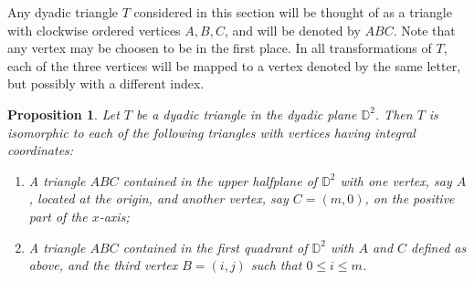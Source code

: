 \documentclass[12pt]{amsart}
\def\mbD{\mathbb{D}}
\theoremstyle{plain}
\newtheorem{proposition}[theorem]{Proposition}
\theoremstyle{definition}
\numberwithin{equation}{section}
\begin{document}
Any dyadic triangle $T$ considered in this section will be thought of as a triangle with
clockwise ordered vertices $A, B, C$, and will be denoted by $ABC$. Note that any vertex may be choosen to be in the first place.
In all transformations of $T$, each of the three vertices will be mapped to a
vertex denoted by the same letter, but possibly with a different index.



\begin{proposition}\label{P:newclassif1}
Let $T$ be a dyadic triangle in the dyadic plane $\mbD^2$. Then $T$ is isomorphic
to each of the following triangles with vertices having integral coordinates:
\begin{enumerate}
\item[(a)] A triangle $ABC$ contained in the upper halfplane of $\mbD^2$ with one vertex, say $A$, located at the origin, and another vertex, say $C = (m,0)$, on the positive part of the $x$-axis;
\item[(b)] A triangle $ABC$ contained in the first quadrant of $\mbD^2$ with $A$ and $C$
    defined as above, and the third vertex $B = (i,j)$ such that $0 \leq i \leq m$.
\end{enumerate}
\end{proposition}
\end{document}

